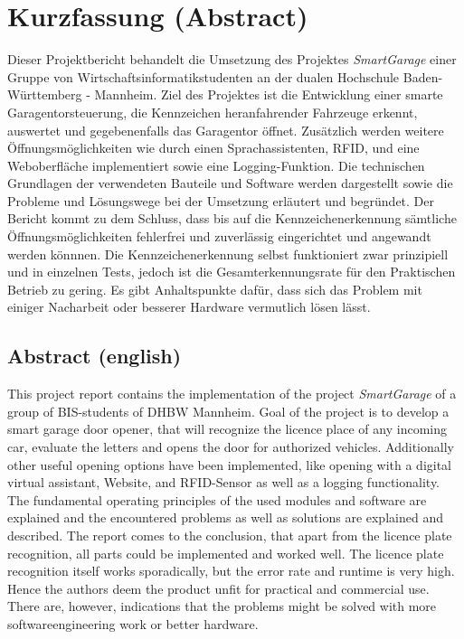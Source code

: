\chapter*{Kurzfassung (Abstract)}

Dieser Projektbericht behandelt die Umsetzung des Projektes \textit{SmartGarage} einer Gruppe von Wirtschaftsinformatikstudenten an der dualen Hochschule Baden-Württemberg - Mannheim.
Ziel des Projektes ist die Entwicklung einer smarte Garagentorsteuerung, die Kennzeichen heranfahrender Fahrzeuge erkennt, auswertet und gegebenenfalls das Garagentor öffnet. Zusätzlich werden weitere Öffnungsmöglichkeiten wie durch einen Sprachassistenten, RFID, und eine Weboberfläche implementiert sowie eine Logging-Funktion. Die technischen Grundlagen der verwendeten Bauteile und Software werden dargestellt sowie die Probleme und Lösungswege bei der Umsetzung erläutert und begründet. \newline 
Der Bericht kommt zu dem Schluss, dass bis auf die Kennzeichenerkennung sämtliche Öffnungsmöglichkeiten fehlerfrei und zuverlässig eingerichtet und angewandt werden könnnen. Die Kennzeichenerkennung selbst funktioniert zwar prinzipiell und in einzelnen Tests, jedoch ist die Gesamterkennungsrate für den Praktischen Betrieb zu gering. Es gibt Anhaltspunkte dafür, dass sich das Problem mit einiger Nacharbeit oder besserer Hardware vermutlich lösen lässt.

\section*{Abstract (english)}
This project report contains the implementation of the project \textit{SmartGarage} of a group of BIS-students of DHBW Mannheim.
Goal of the project is to develop a smart garage door opener, that will recognize the licence place of any incoming car, evaluate the letters and opens the door for authorized vehicles. 
Additionally other useful opening options have been implemented, like opening with a digital virtual assistant, Website, and RFID-Sensor as well as a logging functionality. The fundamental operating principles of the used modules and software are explained and the encountered problems as well as solutions are explained and described. The report comes to the conclusion, that apart from the licence plate recognition, all parts could be implemented and worked well. The licence plate recognition itself works sporadically, but the error rate and runtime is very high. Hence the authors deem the product unfit for practical and commercial use. There are, however, indications that the problems might be solved with more softwareengineering work or better hardware.
